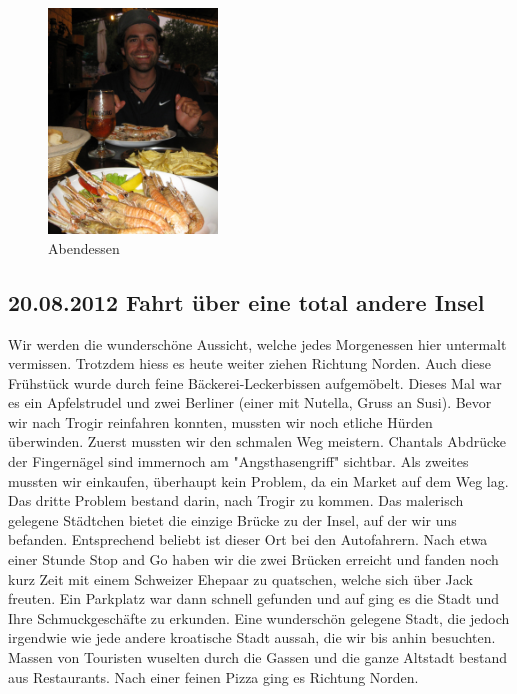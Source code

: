 \begin{figure}[H]
    \centering
    \includegraphics[width=0.4\textwidth]{../Bilder/Sommer2012/77.jpg}
    \caption{Abendessen}
    \label{img:Sommer9}
\end{figure}


\subsection{20.08.2012 Fahrt über eine total andere Insel}
Wir werden die wunderschöne Aussicht, welche jedes Morgenessen hier untermalt vermissen.
Trotzdem hiess es heute weiter ziehen Richtung Norden.
Auch diese Frühstück wurde durch feine Bäckerei-Leckerbissen aufgemöbelt.
Dieses Mal war es ein Apfelstrudel und zwei Berliner (einer mit Nutella, Gruss an Susi).
Bevor wir nach Trogir reinfahren konnten, mussten wir noch etliche Hürden überwinden.
Zuerst mussten wir den schmalen Weg meistern.
Chantals Abdrücke der Fingernägel sind immernoch am "Angsthasengriff" sichtbar.
Als zweites mussten wir einkaufen, überhaupt kein Problem, da ein Market auf dem Weg lag.
Das dritte Problem bestand darin, nach Trogir zu kommen.
Das malerisch gelegene Städtchen bietet die einzige Brücke zu der Insel, auf der wir uns befanden.
Entsprechend beliebt ist dieser Ort bei den Autofahrern.
Nach etwa einer Stunde Stop and Go haben wir die zwei Brücken erreicht und fanden noch kurz Zeit mit einem Schweizer Ehepaar zu quatschen, welche sich über Jack freuten.
Ein Parkplatz war dann schnell gefunden und auf ging es die Stadt und Ihre Schmuckgeschäfte zu erkunden.
Eine wunderschön gelegene Stadt, die jedoch irgendwie wie jede andere kroatische Stadt aussah, die wir bis anhin besuchten.
Massen von Touristen wuselten durch die Gassen und die ganze Altstadt bestand aus Restaurants.
Nach einer feinen Pizza ging es Richtung Norden.

